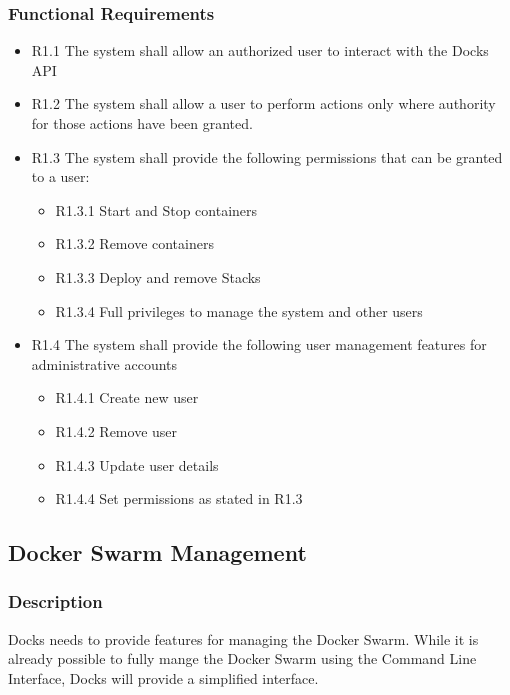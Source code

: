 \documentclass[]{article}
\begin{document}
\subsubsection{Functional Requirements}

\begin{itemize}
	\item R1.1 The system shall allow an authorized user to interact with the Docks API
	\item R1.2 The system shall allow a user to perform actions only where authority for those actions have been granted.
	\item R1.3 The system shall provide the following permissions that can be granted to a user:
		\begin{itemize}
			\item R1.3.1 Start and Stop containers
			\item R1.3.2 Remove containers
			\item R1.3.3 Deploy and remove Stacks
			\item R1.3.4 Full privileges to manage the system and other users
		\end{itemize}
	\item R1.4 The system shall provide the following user management features for administrative accounts
		\begin{itemize}
			\item R1.4.1 Create new user
			\item R1.4.2 Remove user
			\item R1.4.3 Update user details
			\item R1.4.4 Set permissions as stated in R1.3
		\end{itemize}
\end{itemize}

\subsection{Docker Swarm Management}
\subsubsection{Description}
Docks needs to provide features for managing the Docker Swarm. While it is already possible to fully mange the Docker Swarm using the Command Line Interface, Docks will provide a simplified interface.
\end{document}
